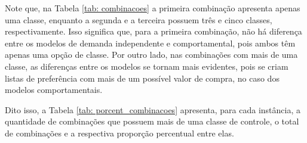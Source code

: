 \begin{table}[]
	\centering
	\caption{Exemplo de combinações}
	\label{tab: combinacoes}
\end{table}

Note que, na Tabela \ref{tab: combinacoes} a primeira combinação apresenta apenas uma classe, enquanto a segunda e a terceira possuem três e cinco classes, respectivamente. 
Isso significa que, para a primeira combinação, não há diferença entre os modelos de demanda independente e comportamental, pois ambos têm apenas uma opção de classe. Por outro lado, nas combinações com mais de uma classe, as diferenças entre os modelos se tornam mais evidentes, pois se criam listas de preferência com mais de um possível valor de compra, no caso dos modelos comportamentais.

Dito isso, a Tabela \ref{tab: porcent_combinacoes} apresenta, para cada instância, a quantidade de combinações que possuem mais de uma classe de controle, o total de combinações e a respectiva proporção percentual entre elas.


